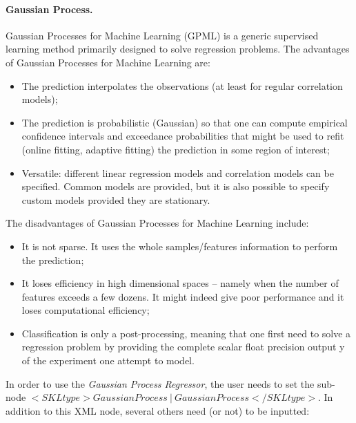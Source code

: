 \paragraph{Gaussian Process.}
\label{GP}
Gaussian Processes for Machine Learning (GPML) is a generic supervised learning method primarily designed to solve regression problems.
The advantages of Gaussian Processes for Machine Learning are:
\begin{itemize}
\item The prediction interpolates the observations (at least for regular correlation models);
\item The prediction is probabilistic (Gaussian) so that one can compute empirical confidence intervals and exceedance probabilities that might be used to refit (online fitting, adaptive fitting) the prediction in some region of interest;
\item Versatile: different linear regression models and correlation models can be specified. Common models are provided, but it is also possible to specify custom models provided they are stationary.
\end{itemize}
The disadvantages of Gaussian Processes for Machine Learning include:
\begin{itemize}
\item It is not sparse. It uses the whole samples/features information to perform the prediction;
\item It loses efficiency in high dimensional spaces – namely when the number of features exceeds a few dozens. It might indeed give poor performance and it loses computational efficiency;
\item Classification is only a post-processing, meaning that one first need to solve a regression problem by providing the complete scalar float precision output y of the experiment one attempt to model.
\end{itemize}
In order to use the \textit{Gaussian Process Regressor}, the user needs to set the sub-node $<SKLtype>GaussianProcess~\vert~GaussianProcess</SKLtype>$. In addition to this XML node, several others need (or not) to be inputted:
